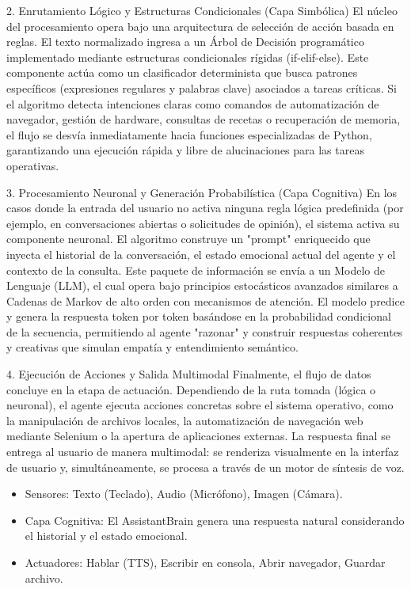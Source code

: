 \documentclass[letterpaper,12pt]{article}
\begin{document}
2. Enrutamiento Lógico y Estructuras Condicionales (Capa Simbólica) El núcleo del procesamiento opera bajo una arquitectura de selección de acción basada en reglas. El texto normalizado ingresa a un Árbol de Decisión programático implementado mediante estructuras condicionales rígidas (if-elif-else). Este componente actúa como un clasificador determinista que busca patrones específicos (expresiones regulares y palabras clave) asociados a tareas críticas. Si el algoritmo detecta intenciones claras como comandos de automatización de navegador, gestión de hardware, consultas de recetas o recuperación de memoria, el flujo se desvía inmediatamente hacia funciones especializadas de Python, garantizando una ejecución rápida y libre de alucinaciones para las tareas operativas.

3. Procesamiento Neuronal y Generación Probabilística (Capa Cognitiva) En los casos donde la entrada del usuario no activa ninguna regla lógica predefinida (por ejemplo, en conversaciones abiertas o solicitudes de opinión), el sistema activa su componente neuronal. El algoritmo construye un "prompt" enriquecido que inyecta el historial de la conversación, el estado emocional actual del agente y el contexto de la consulta. Este paquete de información se envía a un Modelo de Lenguaje (LLM), el cual opera bajo principios estocásticos avanzados similares a Cadenas de Markov de alto orden con mecanismos de atención. El modelo predice y genera la respuesta token por token basándose en la probabilidad condicional de la secuencia, permitiendo al agente "razonar" y construir respuestas coherentes y creativas que simulan empatía y entendimiento semántico.

4. Ejecución de Acciones y Salida Multimodal Finalmente, el flujo de datos concluye en la etapa de actuación. Dependiendo de la ruta tomada (lógica o neuronal), el agente ejecuta acciones concretas sobre el sistema operativo, como la manipulación de archivos locales, la automatización de navegación web mediante Selenium o la apertura de aplicaciones externas. La respuesta final se entrega al usuario de manera multimodal: se renderiza visualmente en la interfaz de usuario y, simultáneamente, se procesa a través de un motor de síntesis de voz.

\begin{itemize}
    \item Sensores: Texto (Teclado), Audio (Micrófono), Imagen (Cámara).
    \item Capa Cognitiva: El AssistantBrain genera una respuesta natural considerando el historial y el estado emocional.
    \item Actuadores: Hablar (TTS), Escribir en consola, Abrir navegador, Guardar archivo.
\end{itemize}
\end{document}
